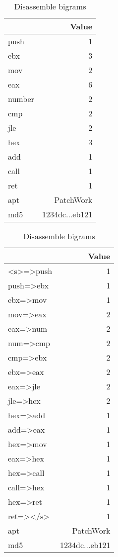 \begin{table}[!htb]
	\begin{minipage}{.5\linewidth}
		\centering
		
		\caption{Disassemble unigrams}
		\label{tab:dis_uni}
		
		\medskip
		
		\begin{tabular}{  lr } 
			\toprule
			\makecell{ Feature }  &  Value \\   
			
			\midrule 
			push & 1	\\
			ebx & 3\\
			mov & 2\\
			eax & 6\\
			number & 2\\
			cmp & 2\\
			jle & 2\\
			hex & 3\\
			add & 1\\
			call & 1\\
			ret & 1\\
			apt            & PatchWork          \\ 
			md5            & 1234dc...eb121 \\ 
			\bottomrule
		\end{tabular}
	\end{minipage}\hfill
	\begin{minipage}{.5\linewidth}
		\centering
		
		\caption{Disassemble bigrams}
		\label{tab:dis_big}
		
		\medskip
		
		\begin{tabular}{  lr } 
			\toprule
			\makecell{ Feature }  &  Value \\   
			
			\midrule 
			<s>=>push & 1	\\
			push=>ebx & 1\\
			ebx=>mov & 1\\
			mov=>eax & 2\\
			eax=>num & 2\\
			num=>cmp & 2\\
			cmp=>ebx & 2\\
			ebx=>eax & 2\\
			eax=>jle & 2\\
			jle=>hex & 2\\
			hex=>add & 1\\
			add=>eax & 1\\
			hex=>mov & 1\\
			eax=>hex & 1\\
			hex=>call & 1\\
			call=>hex & 1\\
			hex=>ret & 1\\
			ret=></s> & 1\\
			apt            & PatchWork          \\ 
			md5            & 1234dc...eb121 \\ 
			\bottomrule
		\end{tabular}
	\end{minipage}
\end{table}


